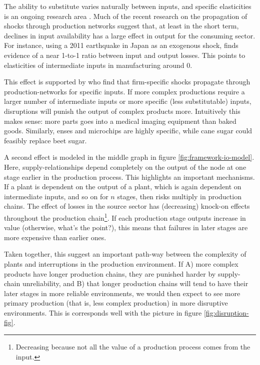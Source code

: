 \documentclass[11pt]{article}
\begin{document}
The ability to substitute varies naturally between inputs, and specific elasticities is an ongoing research area \citep{brummitt_contagious_2017,carvalho_micro_2014}. Much of the recent research on the propagation of shocks through production networks suggest that, at least in the short term, declines in input availability has a large effect in output for the consuming sector. For instance, using a 2011 earthquake in Japan as an exogenous shock, \cite{boehm_input_2019-1} finds evidence of a near 1-to-1 ratio between input and output losses. This points to elasticities of intermediate inputs in manufacturing around 0.

This effect is supported by \cite{barrot_input_2016} who find that firm-specific shocks propagate through production-networks for specific inputs. If more complex productions require a larger number of intermediate inputs or more specific (less substitutable) inputs, disruptions will punish the output of complex products more. Intuitively this makes sense: more parts goes into a medical imaging equipment than baked goods. Similarly, enses and microchips are highly specific, while cane sugar could feasibly replace beet sugar.

A second effect is modeled in the middle graph in figure \ref{fig:framework-io-model}. Here, supply-relationships depend completely on the output of the node at one stage earlier in the production process. This highlights an important mechanisms. If a plant is dependent on the output of a plant, which is again dependent on intermediate inputs, and so on for \(n\) stages, then risks multiply in production chains. The effect of losses in the source sector has (decreasing) knock-on effects throughout the production chain\footnote{Decreasing because not all the value of a production process comes from the input.}. If each production stage outputs increase in value (otherwise, what's the point?), this means that failures in later stages are more expensive than earlier ones.

Taken together, this suggest an important path-way between the complexity of plants and interruptions in the production environment. If A) more complex products have longer production chains, they are punished harder by supply-chain unreliability, and B) that longer production chains will tend to have their later stages in more reliable environments, we would then expect to see more primary production (that is, less complex production) in more disruptive environments. This is corresponds well with the picture in figure \ref{fig:disruption-fig}. 
\end{document}
